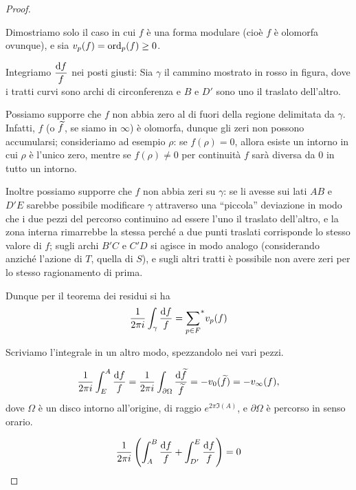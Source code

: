 \begin{proof}
	\begin{figure}
		
	\end{figure}
	Dimostriamo solo il caso in cui $f$ è una forma modulare (cioè $f$ è olomorfa ovunque), e sia $v_p(f)=\text{ord}_p(f)\geq0$.
	
	Integriamo $\displaystyle \frac{\text{d} f}{f}$ nei posti giusti: Sia $\gamma$ il cammino mostrato in rosso in figura, dove i tratti curvi sono archi di circonferenza e $B$ e $D'$ sono uno il traslato dell'altro.
	
	Possiamo supporre che $f$ non abbia zero al di fuori della regione delimitata da $\gamma$.
	Infatti, $f$ (o $\widetilde{f}$, se siamo in $\infty$) è olomorfa, dunque gli zeri non possono accumularsi; consideriamo ad esempio $\rho$: se $f(\rho)=0$, allora esiste un intorno in cui $\rho$ è l'unico zero, mentre se $f(\rho)\neq0$ per continuità $f$ sarà diversa da $0$ in tutto un intorno.
	
	Inoltre possiamo supporre che $f$ non abbia zeri su $\gamma$: se li avesse sui lati $AB$ e $D'E$ sarebbe possibile modificare $\gamma$ attraverso una ``piccola'' deviazione in modo che i due pezzi del percorso continuino ad essere l'uno il traslato dell'altro, e la zona interna rimarrebbe la stessa perché a due punti traslati corrisponde lo stesso valore di $f$; sugli archi $B'C$ e $C'D$ si agisce in modo analogo (considerando anziché l'azione di $T$, quella di $S$), e sugli altri tratti è possibile non avere zeri per lo stesso ragionamento di prima.
	
	Dunque per il teorema dei residui si ha
	\begin{equation*}
		\frac{1}{2\pi i} \int_{\gamma} \frac{\text{d} f}{f}={\sum_{p\in F}}^{*}v_p(f)
	\end{equation*}
	
	Scriviamo l'integrale in un altro modo, spezzandolo nei vari pezzi.
	
	\begin{equation*}
		\frac{1}{2\pi i}\int_E^A\frac{\text{d} f}{f}=\frac{1}{2\pi i}\int_{\partial\Omega}\frac{\text{d} \widetilde{f}}{\widetilde{f}}=-v_0(\widetilde{f})=-v_\infty(f),
	\end{equation*}
	dove $\Omega$ è un disco intorno all'origine, di raggio $e^{2\pi \Im(A)}$, e $\partial\Omega$ è percorso in senso orario.
	
	\begin{equation*}
		\frac{1}{2\pi i}\left( \int_A^B\frac{\text{d} f}{f} + \int_{D'}^E\frac{\text{d} f}{f} \right) =0
	\end{equation*}
	

\end{proof}
